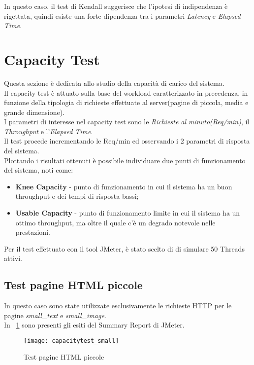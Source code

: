 In questo caso, il test di Kendall suggerisce che l'ipotesi di indipendenza è
rigettata, quindi esiste una forte dipendenza tra i parametri \textit{Latency} e
\textit{Elapsed Time}.


\section{Capacity Test}
Questa sezione è dedicata allo studio della capacità di carico del sistema.\\
Il capacity test è attuato sulla base del workload caratterizzato in precedenza,
in funzione della tipologia di richieste effettuate al server(pagine di
piccola, media e grande dimensione).\\
I parametri di interesse nel capacity test sono le \textit{Richieste al minuto(Req/min)},
il \textit{Throughput} e l'\textit{Elapsed Time}.\\
Il test procede incrementando le Req/min ed osservando i 2 parametri di risposta
del sistema.\\
Plottando i risultati ottenuti è possibile individuare due punti di funzionamento
del sistema, noti come:
\begin{itemize}
  \item \textbf{Knee Capacity} - punto di funzionamento in cui il sistema ha un
  buon throughput e dei tempi di risposta bassi;
  \item \textbf{Usable Capacity} - punto di funzionamento limite in cui il sistema
  ha un ottimo throughput, ma oltre il quale c'è un degrado notevole nelle prestazioni.
\end{itemize}

Per il test effettuato con il tool JMeter, è stato scelto di di simulare 50 Threads
attivi.\\

\subsection{Test pagine HTML piccole}
In questo caso sono state utilizzate esclusivamente le richieste HTTP per le pagine
\textit{small\_text} e \textit{small\_image}.\\
In \figurename~\ref{small_page_summary_report} sono presenti gli esiti del
Summary Report di JMeter.\\

\begin{figure}[!htbp]
  \centering
  \texttt{[image: capacitytest\_small]}
  \caption{Test pagine HTML piccole}
  \label{small_page_summary_report}
\end{figure}

